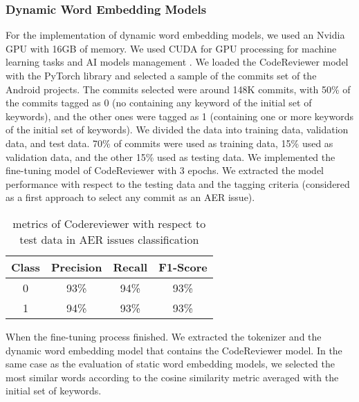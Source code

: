 \subsubsection{Dynamic Word Embedding Models}
For the implementation of dynamic word embedding models, we used an Nvidia GPU with 16GB of memory. We used CUDA for GPU processing for machine learning tasks and AI models management \cite{cuda}. We loaded the CodeReviewer model with the PyTorch library \cite{pytorch} and selected a sample of the commits set of the Android projects. The commits selected were around 148K commits, with 50\% of the commits tagged as  0 (no containing any keyword of the initial set of keywords), and the other ones were tagged as 1 (containing one or more keywords of the initial set of keywords). We divided the data into training data, validation data, and test data. 70\% of commits were used as training data, 15\% used as validation data, and the other 15\% used as testing data. We implemented the fine-tuning model of CodeReviewer with 3 epochs. We extracted the model performance with respect to the testing data and the tagging criteria (considered as a first approach to select any commit as an AER issue).


\begin{table}[h]
    \centering
    \begin{tabular}{|c|c|c|c|}
        \hline
        Class & Precision & Recall & F1-Score \\
        \hline
        0 & 93\% & 94\% & 93\% \\
        \hline
        1 & 94\% & 93\% & 93\% \\
        \hline
    \end{tabular}
     \caption{metrics of Codereviewer with respect to test data in AER issues classification}
    \label{tab:my_label}
\end{table}

When the fine-tuning process finished. We extracted the tokenizer and the dynamic word embedding model that contains the CodeReviewer model. In the same case as the evaluation of static word embedding models, we selected the most similar words according to the cosine similarity metric averaged with the initial set of keywords.

